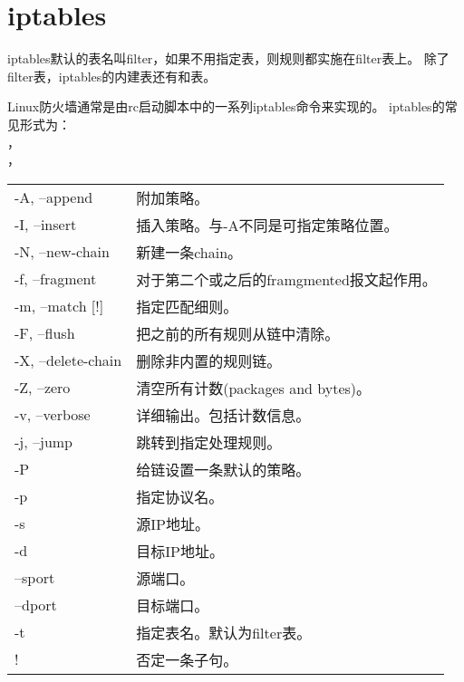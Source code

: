 \chapter{iptables}
iptables默认的表名叫filter，如果不用指定表，则规则都实施在filter表上。
除了filter表，iptables的内建表还有和表。

Linux防火墙通常是由rc启动脚本中的一系列iptables命令来实现的。
iptables的常见形式为：\\
，\\
，\\

\begin{tabular}{ll}
-A, --append        & 附加策略。\\
-I, --insert        & 插入策略。与-A不同是可指定策略位置。\\
-N, --new-chain     & 新建一条chain。\\

-f, --fragment      & 对于第二个或之后的framgmented报文起作用。\\

-m, --match [!]     & 指定匹配细则。\\

-F, --flush         & 把之前的所有规则从链中清除。\\
-X, --delete-chain  & 删除非内置的规则链。\\
-Z, --zero          & 清空所有计数(packages and bytes)。\\
-v, --verbose       & 详细输出。包括计数信息。\\

-j, --jump          & 跳转到指定处理规则。\\

-P                  & 给链设置一条默认的策略。\\
-p                  & 指定协议名。\\
-s                  & 源IP地址。\\
-d                  & 目标IP地址。\\
--sport             & 源端口。\\
--dport             & 目标端口。\\
-t                  & 指定表名。默认为filter表。\\
!                   & 否定一条子句。\\
\end{tabular}


